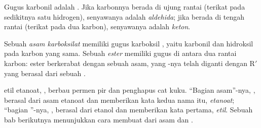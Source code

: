 \begin{definition}\label{def:g11:functional-groups:carbonyl}
Gugus karbonil adalah  . Jika  karbonnya
berada di ujung rantai (terikat pada sedikitnya satu  hidrogen),
senyawanya adalah \emph{aldehida}; jika berada di tengah
rantai (terikat pada dua  karbon), senyawanya adalah
\emph{keton}.
\end{definition}

\begin{definition}\label{def:g11:functional-groups:carboxylic-acid}
Sebuah \emph{asam karboksilat} memiliki gugus
karboksil , yaitu karbonil dan hidroksil pada  karbon
yang sama. Sebuah \emph{ester} memiliki gugus  di
antara dua rantai karbon: ester berkerabat dengan sebuah asam, yang
-nya telah diganti dengan R$'$ yang berasal dari sebuah
.
\end{definition}

\begin{example}\label{ex:g11:functional-groups:ethyl-ethanoate}
 etil etanoat, , berbau permen pir dan
penghapus cat kuku. ``Bagian asam''-nya, , berasal dari asam
etanoat  dan memberikan kata kedua nama itu,
\emph{etanoat}; ``bagian ''-nya, , berasal dari
etanol  dan memberikan kata pertama, \emph{etil}. Sebuah
bab berikutnya menunjukkan cara membuat  dari asam dan .
\end{example}

